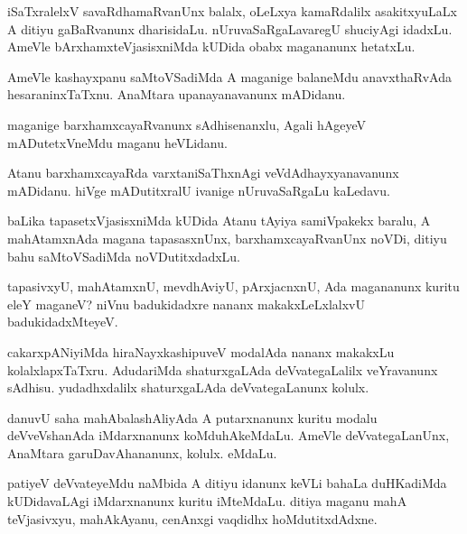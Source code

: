 \documentclass{article}
\begin{document}
\begin{mn}
iSaTxralelxV savaRdhamaRvanUnx balalx, oLeLxya kamaRdalilx asakitxyuLaLx 
A ditiyu gaBaRvanunx dharisidaLu. nUruvaSaRgaLavaregU shuciyAgi idadxLu. 
AmeVle bArxhamxteVjasisxniMda kUDida obabx magananunx hetatxLu.
\end{mn}

\begin{mn}
AmeVle kashayxpanu saMtoVSadiMda A maganige balaneMdu anavxthaRvAda 
hesaraninxTaTxnu. AnaMtara upanayanavanunx mADidanu.
\end{mn}

\begin{mn}
maganige barxhamxcayaRvanunx  sAdhisenanxlu, Agali hAgeyeV mADutetxVneMdu maganu heVLidanu. 
\end{mn}

\begin{mn}
Atanu  barxhamxcayaRda  varxtaniSaThxnAgi veVdAdhayxyanavanunx mADidanu. 
hiVge mADutitxralU ivanige nUruvaSaRgaLu kaLedavu.
\end{mn}

\begin{mn}
baLika tapasetxVjasisxniMda kUDida  Atanu tAyiya samiVpakekx baralu,  
A mahAtamxnAda magana tapasasxnUnx, barxhamxcayaRvanUnx  noVDi, 
ditiyu bahu saMtoVSadiMda noVDutitxdadxLu.
\end{mn}

\begin{mn}
tapasivxyU, mahAtamxnU, mevdhAviyU, pArxjacnxnU, Ada magananunx kuritu eleY 
maganeV? niVnu badukidadxre nananx makakxLeLxlalxvU badukidadxMteyeV.
\end{mn}

\begin{mn}
cakarxpANiyiMda hiraNayxkashipuveV modalAda nananx makakxLu kolalxlapxTaTxru. 
AdudariMda shaturxgaLAda deVvategaLalilx veYravanunx sAdhisu. yudadhxdalilx 
shaturxgaLAda deVvategaLanunx kolulx.
\end{mn}

\begin{mn}
danuvU saha mahAbalashAliyAda A putarxnanunx kuritu modalu deVveVshanAda 
iMdarxnanunx koMduhAkeMdaLu. AmeVle deVvategaLanUnx, AnaMtara 
garuDavAhananunx, kolulx.  eMdaLu.
\end{mn}

\begin{mn}
patiyeV deVvateyeMdu naMbida A ditiyu idanunx keVLi bahaLa duHKadiMda 
kUDidavaLAgi iMdarxnanunx kuritu iMteMdaLu. ditiya maganu mahA teVjasivxyu, 
mahAkAyanu, cenAnxgi vaqdidhx hoMdutitxdAdxne.
\end{mn}
\end{document}
